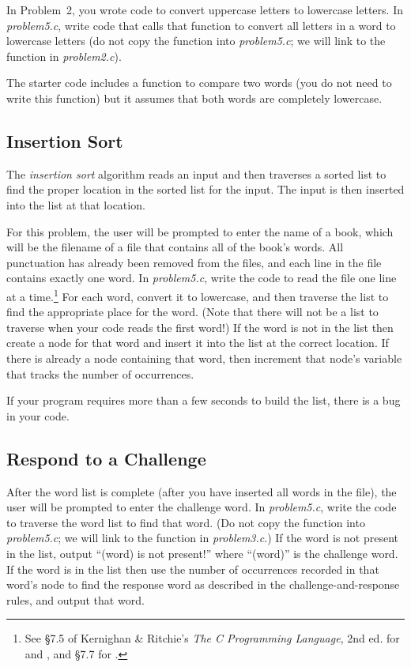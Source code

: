 In Problem~2, you wrote code to convert uppercase letters to lowercase letters.
In \textit{problem5.c}, write code that calls that function to convert all
letters in a word to lowercase letters (do not copy the
 function into \textit{problem5.c}; we will link to
the function in \textit{problem2.c}).

The starter code includes a function to compare two words (you do not need to
write this function) but it assumes that both words are completely lowercase.

\subsection{Insertion Sort}

The \textit{insertion sort} algorithm reads an input and then traverses a
sorted list to find the proper location in the sorted list for the input. The
input is then inserted into the list at that location.

For this problem, the user will be prompted to enter the name of a book, which
will be the filename of a file that contains all of the book's words. All
punctuation has already been removed from the files, and each line in the
file contains exactly one word. In \textit{problem5.c}, write the code to read
the file one line at a time.\footnote{See \S7.5 of Kernighan \& Ritchie's
\textit{The C Programming Language}, 2nd ed. for  and
, and \S7.7 for .} For each word,
convert it to lowercase, and then traverse the list to find the appropriate
place for the word. (Note that there will not be a list to traverse when your
code reads the first word!) If the word is not in the list then create a node
for that word and insert it into the list at the correct location. If there is
already a node containing that word, then increment that node's variable that
tracks the number of occurrences.

If your program requires more than a few seconds to build the list, there is a
bug in your code.

\subsection{Respond to a Challenge}

After the word list is complete (after you have inserted all words in the
file), the user will be prompted to enter the challenge word. In
\textit{problem5.c}, write the code to traverse the word list to find that
word. (Do not copy the  function into \textit{problem5.c};
we will link to the function in \textit{problem3.c}.) If the word is not
present in the list, output ``(word) is not present!'' where ``(word)'' is the
challenge word. If the word is in the list then use the number of occurrences
recorded in that word's node to find the response word as described in the
challenge-and-response rules, and output that word.

